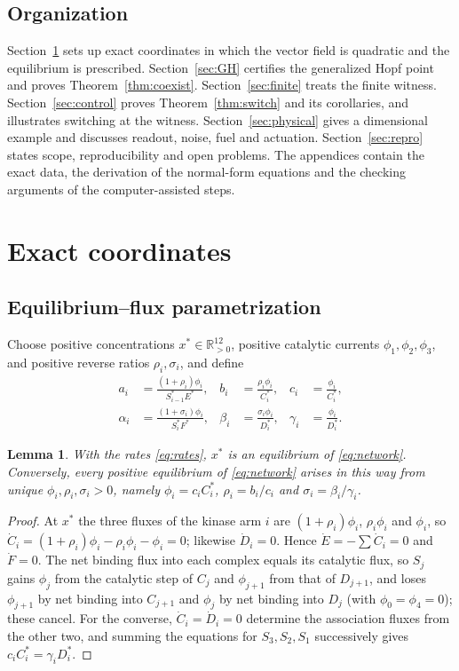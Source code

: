 \documentclass[11pt,a4paper]{article}
\theoremstyle{plain}
\newtheorem{lemma}[theorem]{Lemma}
\theoremstyle{definition}
\theoremstyle{remark}
\newcommand{\R}{\mathbb R}
\begin{document}
\subsection{Organization}
Section~\ref{sec:coords} sets up exact coordinates in which the vector field is quadratic and the equilibrium is prescribed. Section~\ref{sec:GH} certifies the generalized Hopf point and proves Theorem~\ref{thm:coexist}. Section~\ref{sec:finite} treats the finite witness. Section~\ref{sec:control} proves Theorem~\ref{thm:switch} and its corollaries, and illustrates switching at the witness. Section~\ref{sec:physical} gives a dimensional example and discusses readout, noise, fuel and actuation. Section~\ref{sec:repro} states scope, reproducibility and open problems. The appendices contain the exact data, the derivation of the normal-form equations and the checking arguments of the computer-assisted steps.

\section{Exact coordinates}\label{sec:coords}

\subsection{Equilibrium--flux parametrization}
Choose positive concentrations $x^*\in\R^{12}_{>0}$, positive catalytic currents $\phi_1,\phi_2,\phi_3$, and positive reverse ratios $\rho_i,\sigma_i$, and define
\begin{equation}\label{eq:rates}
\begin{aligned}
a_i&=\frac{(1+\rho_i)\phi_i}{S_{i-1}^*E^*},&
b_i&=\frac{\rho_i\phi_i}{C_i^*},&c_i&=\frac{\phi_i}{C_i^*},\\[2pt]
\alpha_i&=\frac{(1+\sigma_i)\phi_i}{S_i^*F^*},&
\beta_i&=\frac{\sigma_i\phi_i}{D_i^*},&\gamma_i&=\frac{\phi_i}{D_i^*}.
\end{aligned}
\end{equation}

\begin{lemma}\label{lem:param}
With the rates \eqref{eq:rates}, $x^*$ is an equilibrium of \eqref{eq:network}. Conversely, every positive equilibrium of \eqref{eq:network} arises in this way from unique $\phi_i,\rho_i,\sigma_i>0$, namely $\phi_i=c_iC_i^*$, $\rho_i=b_i/c_i$ and $\sigma_i=\beta_i/\gamma_i$.
\end{lemma}
\begin{proof}
At $x^*$ the three fluxes of the kinase arm $i$ are $(1+\rho_i)\phi_i$, $\rho_i\phi_i$ and $\phi_i$, so $\dot C_i=(1+\rho_i)\phi_i-\rho_i\phi_i-\phi_i=0$; likewise $\dot D_i=0$. Hence $\dot E=-\sum\dot C_i=0$ and $\dot F=0$. The net binding flux into each complex equals its catalytic flux, so $S_j$ gains $\phi_j$ from the catalytic step of $C_j$ and $\phi_{j+1}$ from that of $D_{j+1}$, and loses $\phi_{j+1}$ by net binding into $C_{j+1}$ and $\phi_j$ by net binding into $D_j$ (with $\phi_0=\phi_4=0$); these cancel. For the converse, $\dot C_i=\dot D_i=0$ determine the association fluxes from the other two, and summing the equations for $S_3,S_2,S_1$ successively gives $c_iC_i^*=\gamma_iD_i^*$.
\end{proof}
\end{document}
